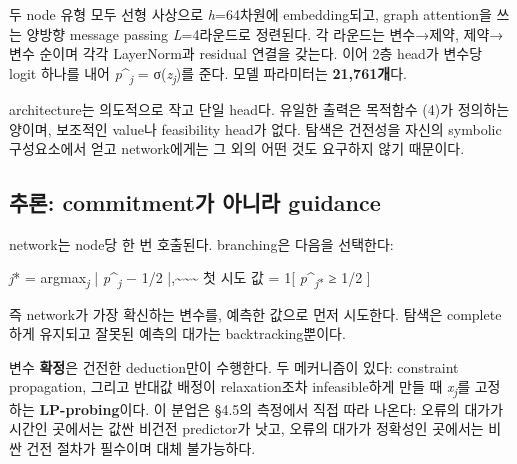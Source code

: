 \documentclass[final,5p,twocolumn]{elsarticle}
\begin{document}
두 node 유형 모두 선형 사상으로 \textit{h}=64차원에 embedding되고, graph attention을 쓰는 양방향 message passing \textit{L}=4라운드로 정련된다. 각 라운드는 변수→제약, 제약→변수 순이며 각각 LayerNorm과 residual 연결을 갖는다. 이어 2층 head가 변수당 logit 하나를 내어 \textit{p}\^{}\textsubscript{\textit{j}} = σ(\textit{z\textsubscript{j}})를 준다. 모델 파라미터는 \textbf{21,761개}다.

architecture는 의도적으로 작고 단일 head다. 유일한 출력은 목적함수 (4)가 정의하는 양이며, 보조적인 value나 feasibility head가 없다. 탐색은 건전성을 자신의 symbolic 구성요소에서 얻고 network에게는 그 외의 어떤 것도 요구하지 않기 때문이다.

\subsection{추론: commitment가 아니라 guidance}
network는 node당 한 번 호출된다. branching은 다음을 선택한다:

\begin{center}\small \textit{j}* = argmax\textsubscript{\textit{j}} | \textit{p}\^{}\textsubscript{\textit{j}} − 1/2 |,\textasciitilde{}\textasciitilde{}\textasciitilde{} 첫 시도 값 = 1[ \textit{p}\^{}\textsubscript{\textit{j}*} ≥ 1/2 ]\end{center}
즉 network가 가장 확신하는 변수를, 예측한 값으로 먼저 시도한다. 탐색은 complete하게 유지되고 잘못된 예측의 대가는 backtracking뿐이다.

변수 \textbf{확정}은 건전한 deduction만이 수행한다. 두 메커니즘이 있다: constraint propagation, 그리고 반대값 배정이 relaxation조차 infeasible하게 만들 때 \textit{x\textsubscript{j}}를 고정하는 \textbf{LP-probing}이다. 이 분업은 §4.5의 측정에서 직접 따라 나온다: 오류의 대가가 시간인 곳에서는 값싼 비건전 predictor가 낫고, 오류의 대가가 정확성인 곳에서는 비싼 건전 절차가 필수이며 대체 불가능하다.
\end{document}
